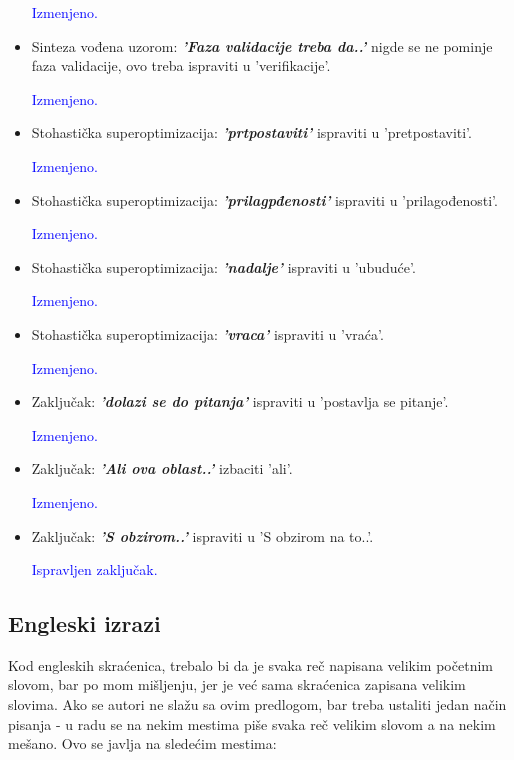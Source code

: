 \documentclass[a4paper]{report}
\newcommand{\odgovor}[1]{\textcolor{blue}{#1}}
\begin{document}
\begin{itemize}
	\odgovor{Izmenjeno.}

    \item Sinteza vođena uzorom: \textbf{\textit{'Faza validacije treba da..'}} nigde se ne pominje faza validacije, ovo treba ispraviti u 'verifikacije'.

	\odgovor{Izmenjeno.}

    \item Stohastička superoptimizacija: \textbf{\textit{'prtpostaviti'}} ispraviti u 'pretpostaviti'.

	\odgovor{Izmenjeno.}

    \item Stohastička superoptimizacija: \textbf{\textit{'prilagpđenosti'}} ispraviti u 'prilagođenosti'.

	\odgovor{Izmenjeno.}

    \item Stohastička superoptimizacija: \textbf{\textit{'nadalje'}} ispraviti u 'ubuduće'.

	\odgovor{Izmenjeno.}

    \item Stohastička superoptimizacija: \textbf{\textit{'vraca'}} ispraviti u 'vraća'.

	\odgovor{Izmenjeno.}

    \item Zaključak: \textbf{\textit{'dolazi se do pitanja'}} ispraviti u 'postavlja se pitanje'.

	\odgovor{Izmenjeno.}

    \item Zaključak: \textbf{\textit{'Ali ova oblast..'}} izbaciti 'ali'.

	\odgovor{Izmenjeno.}    
    
    \item Zaključak: \textbf{\textit{'S obzirom..'}} ispraviti u 'S obzirom na to..'.

    \odgovor {Ispravljen zaključak.}
\end{itemize}


\subsection{Engleski izrazi}
Kod engleskih skraćenica, trebalo bi da je svaka reč napisana velikim početnim slovom, bar po mom mišljenju, jer je već sama skraćenica zapisana velikim slovima. Ako se autori ne slažu sa ovim predlogom, bar treba ustaliti jedan način pisanja - u radu se na nekim mestima piše svaka reč velikim slovom a na nekim mešano. Ovo se javlja na sledećim mestima:
\end{document}
